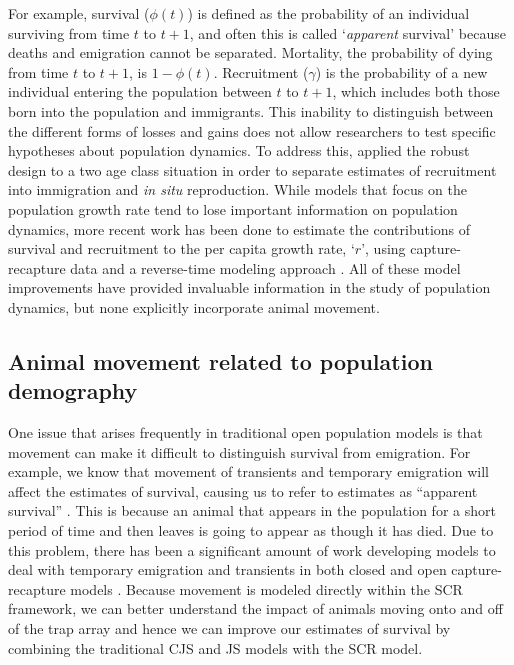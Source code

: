 For example, survival
($\phi(t)$) is defined as the probability of an individual surviving
from time $t$ to $t+1$, and often this is called `\textit{apparent}
survival' because deaths and emigration cannot be
separated. Mortality, the probability of dying from time $t$ to $t+1$,
is $1-\phi(t)$.  Recruitment ($\gamma$) is the probability of a new
individual entering the population between $t$ to $t+1$, which
includes both those born into the population and immigrants. This
inability to distinguish between the different forms of losses and
gains does not allow researchers to test specific hypotheses about
population dynamics.  To address this, \citet{nichols_pollock:1990}
applied the robust design to a two age class situation in order to
separate estimates of recruitment into immigration and {\it in situ }
reproduction.  While models that focus on the population growth rate
tend to lose important information on population dynamics, more recent
work has been done to estimate the contributions of survival and
recruitment to the per capita growth rate, `$r$', using
capture-recapture data and a reverse-time modeling approach
\citep{pradel:1996, nichols_etal:2000a}.  All of these model
improvements have provided invaluable information in the study of
population dynamics, but none explicitly incorporate animal movement.


\subsection{Animal movement related to population demography}


One issue that arises frequently in traditional open population
models is that movement can make it difficult to distinguish survival
from emigration.  For example, we know that movement of transients and
temporary emigration will affect the estimates of survival, causing us
to refer to estimates as ``apparent survival''
\citep{lebreton_etal:1992}.  This is because an animal that appears
in the population for a short period of time and then leaves is going
to appear as though it has died.  Due to this problem, there has been
a significant amount of work developing models to deal with temporary
emigration and transients in both closed and open capture-recapture
models \citep{kendall_etal:1997, pradel_hines:1997, hines_etal:2003,
  clavel_etal:2008, gilroy_etal:2012,chandler_etal:2011}.  
Because movement is modeled 
directly within the SCR framework, we can better understand the impact
of animals moving onto and off of the trap array and hence we can
improve our estimates of survival by combining the traditional CJS and
JS models with the SCR model.

